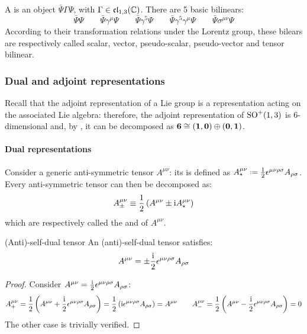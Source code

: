 A  is an object $ \bar{\Psi} \Gamma \Psi $, with $ \Gamma \in \mathfrak{cl}_{1,3}(\mathbb{C}) $. There are 5 basic bilinears:
\begin{equation*}
  \bar{\Psi} \Psi
  \qquad
  \bar{\Psi} \gamma^\mu \Psi
  \qquad
  \bar{\Psi} \gamma^5 \Psi
  \qquad
  \bar{\Psi} \gamma^5 \gamma^\mu \Psi
  \qquad
  \bar{\Psi} \sigma^{\mu \nu} \Psi
\end{equation*}
According to their transformation relations under the Lorentz group, these bilears are respectively called scalar, vector, pseudo-scalar, pseudo-vector and tensor bilinear.

\subsubsection{Dual and adjoint representations}

Recall that the adjoint representation of a Lie group is a representation acting on the associated Lie algebra: therefore, the adjoint representation of $ \mathrm{SO}^+(1,3) $ is 6-dimensional and, by , it can be decomposed as $ \mathbf{6} \cong \mathbf{\left( 1,0 \right)} \oplus \mathbf{\left( 0,1 \right)} $.

\paragraph{Dual representations}

Consider a generic anti-symmetric tensor $ A^{\mu \nu} $: its  is defined as $ A_\star^{\mu \nu} \defeq \frac{1}{2} \epsilon^{\mu \nu \rho \sigma} A_{\rho \sigma} $. Every anti-symmetric tensor can then be decomposed as:
\begin{equation}
  A^{\mu \nu}_{\pm} \equiv \frac{1}{2} \left( A^{\mu \nu} \pm \mathrm{i} A_\star^{\mu \nu} \right)
\end{equation}
which are respectively called the  and  of $ A^{\mu \nu} $.

\begin{lemma}{(Anti)-self-dual tensor}{}
  An (anti)-self-dual tensor satisfies:
  \begin{equation}
    A^{\mu \nu} = \pm \frac{\mathrm{i}}{2} \epsilon^{\mu \nu \rho \sigma} A_{\rho \sigma}
  \end{equation}
\end{lemma}

\begin{proofbox}
  \begin{proof}
    Consider $ A^{\mu \nu} = \frac{\mathrm{i}}{2} \epsilon^{\mu \nu \rho \sigma} A_{\rho \sigma} $:
    \begin{equation*}
      A^{\mu \nu}_+ = \frac{1}{2} \left( A^{\mu \nu} + \frac{\mathrm{i}}{2} \epsilon^{\mu \nu \rho \sigma} A_{\rho \sigma} \right) = \frac{1}{2} \left( \mathrm{i} \epsilon^{\mu \nu \rho \sigma} A_{\rho \sigma} \right) = A^{\mu \nu}
      \qquad
      A^{\mu \nu}_- = \frac{1}{2} \left( A^{\mu \nu} - \frac{\mathrm{i}}{2} \epsilon^{\mu \nu \rho \sigma} A_{\rho \sigma} \right) = 0
    \end{equation*}
    The other case is trivially verified.
  \end{proof}
\end{proofbox}

